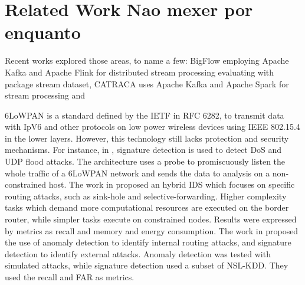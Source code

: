 
\section{Related Work {\color{red} Nao mexer por enquanto}}
\label{sec:related}

Recent works explored those areas, to name a few: BigFlow \cite{Viegas2019}
employing Apache Kafka and Apache Flink for distributed stream processing
evaluating with package stream dataset,
CATRACA \cite{Lopez2018,AndreoniLopez2019a} uses 
Apache Kafka and Apache Spark for stream processing and 

\cite{DaCosta2019a}


6LoWPAN is a standard defined by the IETF in RFC 6282, to transmit data with IpV6 and other protocols on low power wireless devices using IEEE 802.15.4 in the lower layers. However, this technology still lacks protection and security mechanisms. %
%
For instance, in \cite{dos-6lowpan-iot}, signature detection is used to detect DoS and UDP flood attacks. The architecture uses a probe to promiscuously listen the whole traffic of a 6LoWPAN network and sends the data to analysis on a non-constrained host.
The work in \cite{SVELTE} proposed an hybrid IDS which focuses on specific routing attacks, such as sink-hole and selective-forwarding. Higher complexity tasks which demand more computational resources are executed on the border router, while simpler tasks execute on constrained nodes. Results were expressed by metrics as recall and memory and energy consumption.
The work in \cite{Hybrid-ids-arch-iot} proposed the use of anomaly detection to identify internal routing attacks, and signature detection to identify external attacks. Anomaly detection was tested with simulated attacks, while signature detection used a subset of NSL-KDD. They used the recall and FAR as metrics. 


